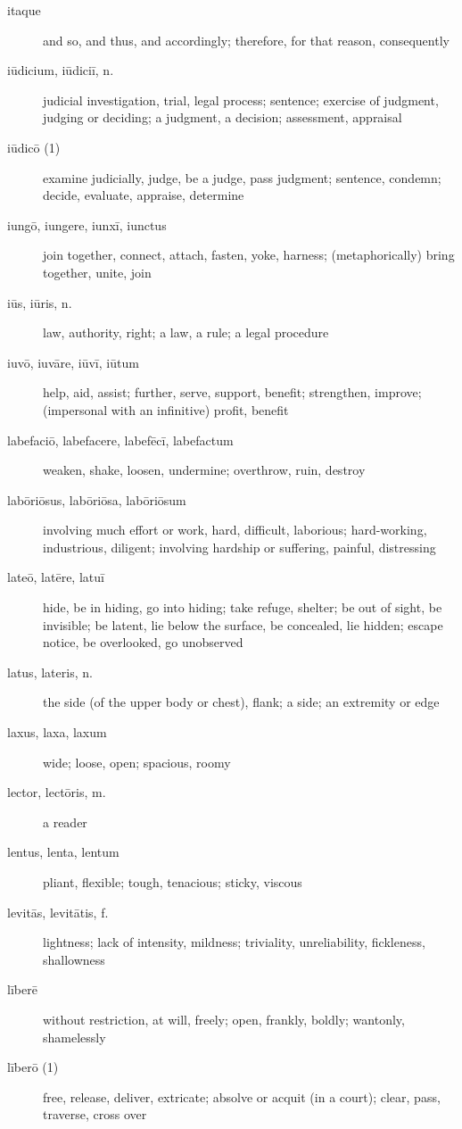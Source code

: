\begin{description}
    \item[itaque] \marginnote{*}and so, and thus, and accordingly; therefore, for that reason, consequently
    \item[iūdicium, iūdiciī, n.] \marginnote{*}judicial investigation, trial, legal process; sentence; exercise of judgment, judging or deciding; a judgment, a decision; assessment, appraisal
    \item[iūdicō (1)] \marginnote{*}examine judicially, judge, be a judge, pass judgment; sentence, condemn; decide, evaluate, appraise, determine
    \item[iungō, iungere, iunxī, iunctus] \marginnote{*}join together, connect, attach, fasten, yoke, harness; (metaphorically) bring together, unite, join
    \item[iūs, iūris, n.] \marginnote{*}law, authority, right; a law, a rule; a legal procedure
    \item[iuvō, iuvāre, iūvī, iūtum] \marginnote{*}help, aid, assist; further, serve, support, benefit; strengthen, improve; (impersonal with an infinitive) profit, benefit
    \item[labefaciō, labefacere, labefēcī, labefactum] weaken, shake, loosen, undermine; overthrow, ruin, destroy
    \item[labōriōsus, labōriōsa, labōriōsum] involving much effort or work, hard, difficult, laborious; hard-working, industrious, diligent; involving hardship or suffering, painful, distressing
    \item[lateō, latēre, latuī] \marginnote{*}hide, be in hiding, go into hiding; take refuge, shelter; be out of sight, be invisible; be latent, lie below the surface, be concealed, lie hidden; escape notice, be overlooked, go unobserved
    \item[latus, lateris, n.] \marginnote{*}the side (of the upper body or chest), flank; a side; an extremity or edge
    \item[laxus, laxa, laxum] wide; loose, open; spacious, roomy
    \item[lector, lectōris, m.] a reader
    \item[lentus, lenta, lentum] pliant, flexible; tough, tenacious; sticky, viscous
    \item[levitās, levitātis, f.] lightness; lack of intensity, mildness; triviality, unreliability, fickleness, shallowness
    \item[līberē] without restriction, at will, freely; open, frankly, boldly; wantonly, shamelessly
    \item[līberō (1)] free, release, deliver, extricate; absolve or acquit (in a court); clear, pass, traverse, cross over

\end{description}
